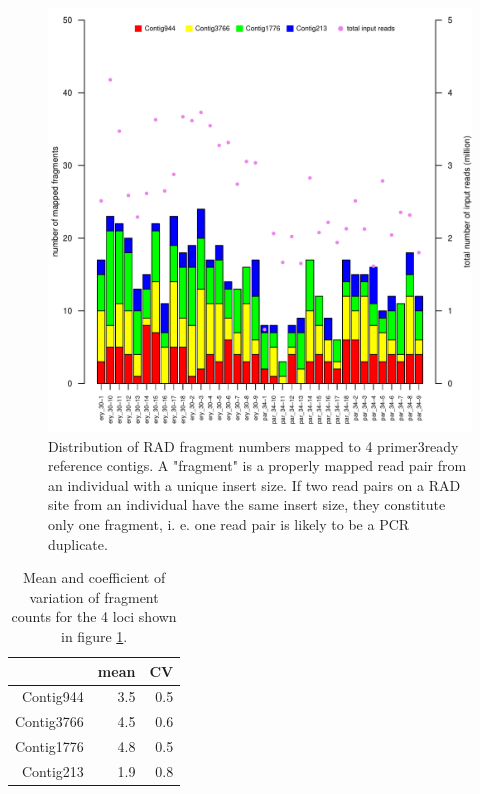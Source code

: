 \documentclass{article}\usepackage[]{graphicx}\usepackage[]{color}
\newenvironment{knitrout}{}{} %
\begin{document}
\begin{figure}
\begin{knitrout}
\color{fgcolor}

{\centering \includegraphics[width=\linewidth]{figure/fragments_mapped_per_ind-1} 

}



\end{knitrout}
\caption{Distribution of RAD fragment numbers mapped to 4 primer3ready reference contigs. A "fragment" is a properly mapped read pair from an individual with a unique insert size. If two read pairs on a RAD site from an individual have the same insert size, they constitute only one fragment, i. e. one read pair is likely to be a PCR duplicate.}
\label{fragments-mapped-per-ind}
\end{figure}


\begin{table}[ht]
\centering
\caption{Mean and coefficient of variation of fragment counts for the 4 loci shown in figure \ref{fragments-mapped-per-ind}.} 
\label{mean_sd_fragNum_per_locus}
\begin{tabular}{rrr}
  \hline
 & mean & CV \\ 
  \hline
Contig944 & 3.5 & 0.5 \\ 
  Contig3766 & 4.5 & 0.6 \\ 
  Contig1776 & 4.8 & 0.5 \\ 
  Contig213 & 1.9 & 0.8 \\ 
   \hline
\end{tabular}
\end{table}
\end{document}
